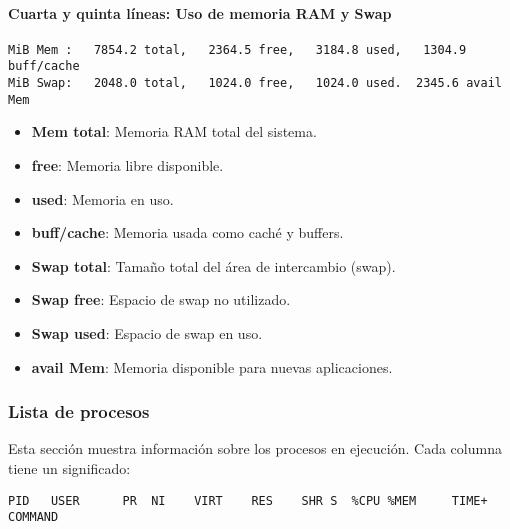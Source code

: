 \paragraph{Cuarta y quinta líneas: Uso de memoria RAM y Swap}
\begin{verbatim}
MiB Mem :   7854.2 total,   2364.5 free,   3184.8 used,   1304.9 buff/cache
MiB Swap:   2048.0 total,   1024.0 free,   1024.0 used.  2345.6 avail Mem
\end{verbatim}
\begin{itemize}
  \item \textbf{Mem total}: Memoria RAM total del sistema.
  \item \textbf{free}: Memoria libre disponible.
  \item \textbf{used}: Memoria en uso.
  \item \textbf{buff/cache}: Memoria usada como caché y buffers.
  \item \textbf{Swap total}: Tamaño total del área de intercambio (swap).
  \item \textbf{Swap free}: Espacio de swap no utilizado.
  \item \textbf{Swap used}: Espacio de swap en uso.
  \item \textbf{avail Mem}: Memoria disponible para nuevas aplicaciones.
\end{itemize}

\subsubsection*{Lista de procesos}

Esta sección muestra información sobre los procesos en ejecución. Cada columna tiene un significado:

\begin{verbatim}
PID   USER      PR  NI    VIRT    RES    SHR S  %CPU %MEM     TIME+ COMMAND
\end{verbatim}

